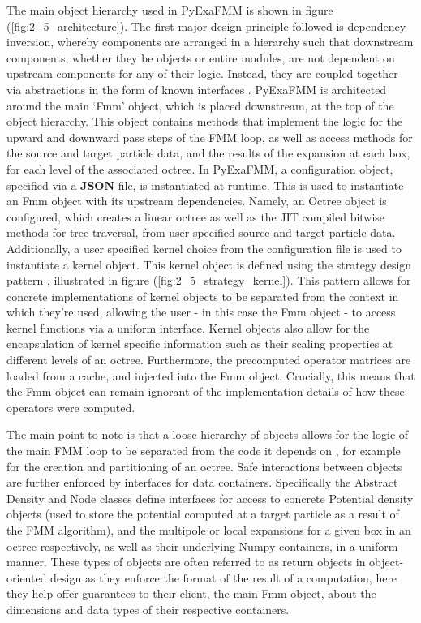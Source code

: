 The main object hierarchy used in \gls{PyExaFMM} is shown in figure
(\ref{fig:2_5_architecture}). The first major design principle followed is dependency
inversion, whereby components are arranged in a hierarchy such that downstream
components, whether they be objects or entire modules, are not dependent on
upstream components for any of their logic. Instead, they are coupled together via
abstractions in the form of known interfaces \cite{Gamma:1994:Addison}. \gls{PyExaFMM} is architected
around the main `Fmm' object, which is placed downstream, at the top of the object hierarchy.
This object contains methods that implement the logic for the
upward and downward pass steps of the \gls{FMM} loop, as well as access methods
for the source and target particle data, and the results of the expansion at each box, for each level of the associated octree.
In \gls{PyExaFMM}, a configuration object, specified via a \textbf{\gls{JSON}} file, is instantiated
at runtime. This is used to instantiate an Fmm object with its upstream dependencies.
Namely, an Octree object is configured, which creates a linear octree as well
as the \gls{JIT} compiled bitwise methods for tree traversal, from user
specified source and target particle data. Additionally, a user specified kernel choice
from the configuration file is used to instantiate a kernel object.
This kernel object is defined using the strategy design pattern
\cite{Gamma:1994:Addison}, illustrated in figure (\ref{fig:2_5_strategy_kernel}).
This pattern allows for concrete implementations of kernel objects to be separated
from the context in which they're used, allowing the user - in this case the
Fmm object - to access kernel functions via a uniform interface. Kernel
objects also allow for the encapsulation of
kernel specific information such as their scaling properties at different levels
of an octree. Furthermore, the precomputed operator matrices are loaded from a cache,
and injected into the Fmm object. Crucially, this means that the Fmm object can
remain ignorant of the implementation details of how these operators were computed.

The main point to note is that a loose hierarchy of objects allows for
the logic of the main \gls{FMM} loop to be separated from the code it depends on
, for example for the creation and partitioning of an octree.
Safe interactions between objects are further enforced by interfaces for data containers.
Specifically the Abstract Density and Node classes define interfaces for access to concrete Potential density
objects (used to store the potential computed at a target particle as a result
of the FMM algorithm), and the multipole or local expansions for a given box in an octree respectively,
as well as their underlying Numpy containers, in a uniform manner.
These types of objects are often referred to as return objects in object-oriented
design as they enforce the format of the result of a computation,
here they help offer guarantees to their client, the main Fmm object,
about the dimensions and data types of their respective containers.

